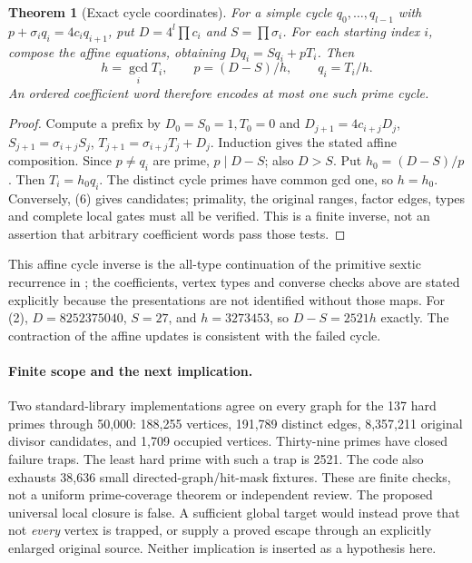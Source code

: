 \documentclass[10pt,a4paper]{article}
\newtheorem{theorem}{Theorem}
\begin{document}
\begin{theorem}[Exact cycle coordinates]
For a simple cycle $q_0,\ldots,q_{l-1}$ with
$p+\sigma_iq_i=4c_iq_{i+1}$, put $D=4^l\prod c_i$ and $S=\prod\sigma_i$.
For each starting index $i$, compose the affine equations, obtaining
$Dq_i=Sq_i+pT_i$. Then
\[
 \boxed{h=\gcd_iT_i,\qquad p=(D-S)/h,\qquad q_i=T_i/h.}   \tag{6}
\]
 An ordered coefficient word therefore encodes at most one such prime cycle.
\end{theorem}
\begin{proof}
Compute a prefix by $D_0=S_0=1,T_0=0$ and
$D_{j+1}=4c_{i+j}D_j$, $S_{j+1}=\sigma_{i+j}S_j$,
$T_{j+1}=\sigma_{i+j}T_j+D_j$. Induction gives the stated affine composition.
Since $p\ne q_i$ are prime, $p\mid D-S$; also $D>S$. Put $h_0=(D-S)/p$.
Then $T_i=h_0q_i$. The distinct cycle primes have common gcd one, so $h=h_0$.
Conversely, (6) gives candidates; primality, the original ranges, factor edges,
types and complete local gates must all be verified. This is a finite inverse,
 not an assertion that arbitrary coefficient words pass those tests.
 \end{proof}
 This affine cycle inverse is the all-type continuation of the primitive sextic
 recurrence in \cite[\S\S2--4]{BryanChain}; the coefficients, vertex types and
 converse checks above are stated explicitly because the presentations are not
 identified without those maps.
For (2), $D=8252375040$, $S=27$, and $h=3273453$, so $D-S=2521h$ exactly.
The contraction of the affine updates is consistent with the failed cycle.

\paragraph{Finite scope and the next implication.}
Two standard-library implementations agree on every graph for the 137 hard
primes through 50,000: 188,255 vertices, 191,789 distinct edges, 8,357,211
original divisor candidates, and 1,709 occupied vertices. Thirty-nine primes
have closed failure traps. The least hard prime with such a trap is 2521.
The code also exhausts 38,636 small directed-graph/hit-mask fixtures. These
are finite checks, not a uniform prime-coverage theorem or independent review.
The proposed universal local closure is false. A sufficient global target
would instead prove that not \emph{every} vertex is trapped, or supply a proved
escape through an explicitly enlarged original source. Neither implication
is inserted as a hypothesis here.
\end{document}

